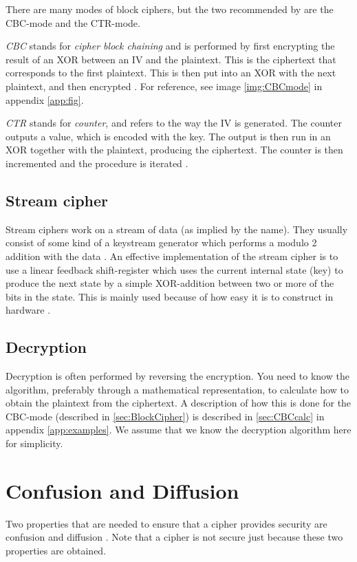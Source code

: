 There are many modes of block ciphers, but the two recommended by 
\citet{Schneier:2003} are the CBC-mode and the CTR-mode.

\emph{CBC} stands for \emph{cipher block chaining} and is performed by 
first encrypting the result of an XOR between an IV and the plaintext. 
This is the ciphertext that corresponds to the first plaintext. This is 
then put into an XOR with the next plaintext, and then encrypted 
\citep[pp. 109--111]{Stinson:2006}. For reference, see image 
\ref{img:CBCmode} in appendix \ref{app:fig}.

\emph{CTR} stands for \emph{counter}, and refers to the way the IV is 
generated. The counter outputs a value, which is encoded with the key. 
The output is then run in an XOR together with the plaintext, producing 
the ciphertext. The counter is then incremented and the procedure is 
iterated \citep[p. 111]{Stinson:2006}.

\subsection{Stream cipher} \label{sec:StreamCipher}
Stream ciphers work on a stream of data (as implied by the name). They 
usually consist of some kind of a keystream generator which performs a 
modulo 2 addition with the data \cite[pp. 67]{Simmons:1992}. An 
effective implementation of the stream cipher is to use a linear 
feedback shift-register which uses the current internal state (key) to 
produce the next state by a simple XOR-addition between two or more of 
the bits in the state. This is mainly used because of how easy it is to 
construct in hardware \citep{LFSR:2008}.

\subsection{Decryption}
Decryption is often performed by reversing the encryption. You need to 
know the algorithm, preferably through a mathematical representation, 
to calculate how to obtain the plaintext from the ciphertext. A 
description of how this is done for the CBC-mode (described in 
\ref{sec:BlockCipher}) is described in \ref{sec:CBCcalc} in appendix 
\ref{app:examples}. We assume that we know the decryption algorithm 
here for simplicity. 

\section{Confusion and Diffusion}\label{ch:ConfDiff}
Two properties that are needed to ensure that a cipher provides 
security are confusion and diffusion \citep{Shannon:1949}. Note that a 
cipher is not secure just because these two properties are obtained.

